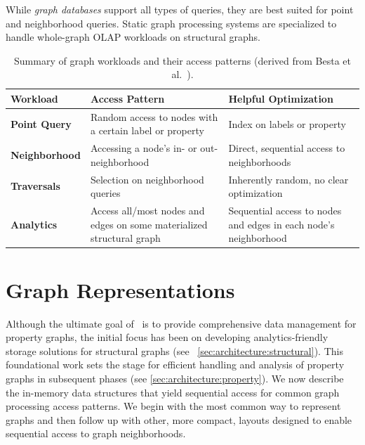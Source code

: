 While \emph{graph databases} support all types of queries, they are best suited for point and neighborhood queries.
Static graph processing systems are specialized to handle whole-graph OLAP workloads on structural graphs.

\begin{table}[h!]
  \centering
  \begin{tabularx}{\columnwidth}{|l|X|X|}
  \hline
  \textbf{Workload} & \textbf{Access Pattern} & \textbf{Helpful Optimization} \\ \hline
  \textbf{Point Query} & 
    Random access to nodes with a certain label or property & 
    Index on labels or property \\ \hline
  \textbf{Neighborhood} & 
    Accessing a node's in- or out-neighborhood & 
    Direct, sequential access to neighborhoods \\ \hline
  \textbf{Traversals} & 
    Selection on neighborhood queries & 
    Inherently random, no clear optimization \\ \hline
  \textbf{Analytics} & 
    Access all/most nodes and edges on some materialized structural graph & 
    Sequential access to nodes and edges in each node's neighborhood \\ \hline
  \end{tabularx}
  \caption{Summary of graph workloads and their access patterns (derived from Besta et al.~\cite{besta2020demystifying}).}
  \label{tab:bg:workload_patterns}
\end{table}

\section{Graph Representations}
\label{sec:bg:reps}
Although the ultimate goal of~\project{} is to provide comprehensive data management for property graphs, the initial focus has been on developing analytics-friendly storage solutions for structural graphs (see ~\autoref{sec:architecture:structural}).
This foundational work sets the stage for efficient handling and analysis of property graphs in subsequent phases (see \autoref{sec:architecture:property}).
We now describe the in-memory data structures that yield sequential access for common graph processing access patterns.
We begin with the most common way to represent graphs and then follow up with other, more compact, layouts designed to enable sequential access to graph neighborhoods.

